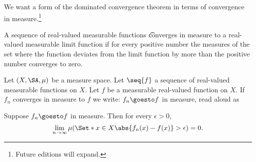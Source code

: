 

We want a form of the dominated convergence theorem in terms of convergence in measure.\footnote{Future editions will expand.}


A sequence of real-valued measurable functions \t{converges in measure} to a real-valued measurable limit function if for every positive number the measures of the set where the function deviates from the limit function by more than the positive number converges to zero.


Let $(X, \SA, \mu)$ be a measure space.
Let $\seq{f}$ a sequence of real-valued measurable functions on $X$.
Let $f$ be a measurable real-valued function on $X$.
If $f_n$ converges in measure to $f$ we write: $f_n \goesto f$ in measure, read aloud as 

Suppose $f_n \goesto f$ in measure.
Then for every $\epsilon > 0$,
\[
\lim_{n \to \infty} \mu(\Set*{x \in X}{\abs{f_n(x) - f(x)} > \epsilon}) = 0.
\]

\blankpage

